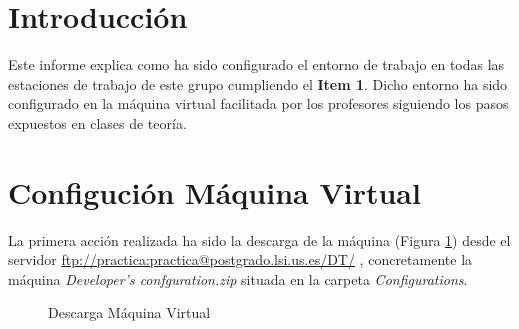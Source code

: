 \documentclass{scrartcl}
\begin{document}




\section{Introducción}
Este informe explica como ha sido configurado el entorno de trabajo en todas las estaciones de trabajo de este grupo cumpliendo el \textbf{Item 1}. Dicho entorno ha sido configurado en la máquina virtual facilitada por los profesores siguiendo los pasos expuestos en clases de teoría.
\section{Configución Máquina Virtual}
La primera acción realizada ha sido la descarga de la máquina  (Figura \ref{fig:ConfVM01}) desde el servidor \href{ftp://practica:practica@postgrado.lsi.us.es/DT/}{ftp://practica:practica@postgrado.lsi.us.es/DT/} , concretamente la máquina \textit{Developer's confguration.zip}  situada en la carpeta  \textit{Configurations}.

\begin{figure}[H]
	
	\centering
	\caption{Descarga Máquina Virtual}
	\label{fig:ConfVM01}
	
\end{figure}
\end{document}
